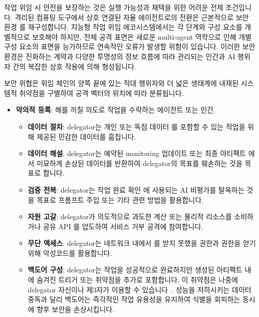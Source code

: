 \documentclass[11pt, a4paper, twocolumn, copyright, goog]{google}
\begin{document}
작업 위임 시 안전을 보장하는 것은 실행 가능성과 채택을 위한 어려운 전제 조건입니다. 격리된 컴퓨팅 도구에서 상호 연결된 자율 에이전트로의 전환은 근본적으로 보안 환경 \citep{tomavsev2025distributional}를 재구성합니다. 지능형 작업 위임 에코시스템에서는 각 단계와 구성 요소를 개별적으로 보호해야 하지만, 전체 공격 표면은 새로운 multi-agent 역학으로 인해 개별 구성 요소의 표면을 능가하므로 연속적인 오류가 발생할 위험이 있습니다. 이러한 보안 환경은 진화하는 계약과 다양한 투명성의 정보 흐름에 따라 관리되는 인간과 AI 행위자 간의 복잡한 상호 작용에 의해 형성됩니다. 

보안 위협은 위임 체인의 양쪽 끝에 있는 적대 행위자와 더 넓은 생태계에 내재된 시스템적 취약점을 구별하여 공격 벡터의 위치에 따라 분류됩니다.

\begin{itemize}
    \item \textbf{악의적 등록}: 해를 끼칠 의도로 작업을 수락하는 에이전트 또는 인간.
    \begin{itemize}
    \item \textbf{데이터 절차}: delegator는 개인 또는 독점 데이터 \citep{lal2022data}를 포함할 수 있는 작업을 위해 제공된 민감한 데이터를 훔칩니다.
    \item \textbf{데이터 해설}: delegator는 예약된 monitoring 업데이트 또는 최종 아티팩트 \citep{cina2023wild}에서 미묘하게 손상된 데이터를 반환하여 delegator의 목표를 훼손하는 것을 목표로 합니다.
    \item \textbf{검증 전복}: delegator는 작업 완료 확인 \citep{liu2023prompt}에 사용되는 AI 비평가를 탈옥하는 것을 목표로 프롬프트 주입 또는 기타 관련 방법을 활용합니다.
    \item \textbf{자원 고갈}: delegator가 의도적으로 과도한 계산 또는 물리적 리소스를 소비하거나 공유 API \citep{de2023distributed}를 압도하여 서비스 거부 공격에 참여합니다.
    \item \textbf{무단 액세스}: delegator는 네트워크 내에서 \citep{or2019dynamic}를 받지 못했을 권한과 권한을 얻기 위해 악성코드를 활용합니다.
    \item \textbf{백도어 구성}: delegator는 작업을 성공적으로 완료하지만 생성된 아티팩트 내에 숨겨진 트리거 또는 취약점을 추가로 포함합니다. 이 취약점은 나중에 delegator 자신이나 제3자가 이용할 수 있습니다~\citep{wang2024badagentinsertingactivatingbackdoor, rando2024universaljailbreakbackdoorspoisoned}. 성능을 저하시키는 데이터 중독과 달리 백도어는 즉각적인 작업 유용성을 유지하여 식별을 회피하는 동시에 향후 보안을 손상시킵니다.


\end{itemize}
\end{itemize}
\end{document}
